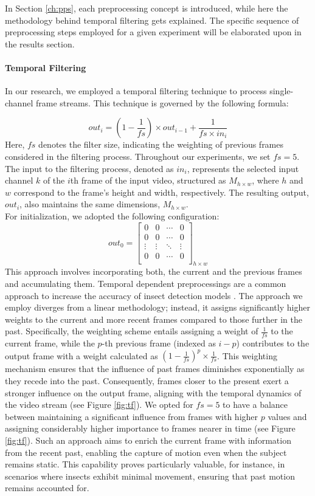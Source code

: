 \documentclass[sigchi,screen]{acmart}
\begin{document}
In Section \ref{ch:pps}, each preprocessing concept is introduced, while here the methodology behind temporal filtering gets explained. The specific sequence of preprocessing steps employed for a given experiment will be elaborated upon in the results section.

\paragraph{Temporal Filtering}
\label{ch:pp-tf}
In our research, we employed a temporal filtering technique to process single-channel frame streams. This technique is governed by the following formula:

\[
out_i = {\left(1 - \frac{1}{fs}\right)} \times out_{i-1} + \frac{1}{fs \times in_i} 
\] 
Here, $fs$ denotes the filter size, indicating the weighting of previous frames considered in the filtering process. Throughout our experiments, we set $fs = 5$. The input to the filtering process, denoted as $in_i$, represents the selected input channel $k$ of the $i$th frame of the input video, structured as $M_{h\times w}$, where $h$ and $w$ correspond to the frame's height and width, respectively. The resulting output, $out_i$, also maintains the same dimensions, $M_{h\times w}$. \\
For initialization, we adopted the following configuration: \[
out_0 = \begin{bmatrix}
0 & 0 & \cdots & 0 \\
0 & 0 & \cdots & 0 \\
\vdots & \vdots & \ddots & \vdots \\
0 & 0 & \cdots & 0 \\
\end{bmatrix}_{h \times w}
\] This approach involves incorporating both, the current and the previous frames and accumulating them. Temporal dependent preprocessings are a common approach to increase the accuracy of insect detection models \cite{thiele2021towards}. The approach we employ diverges from a linear methodology; instead, it assigns significantly higher weights to the current and more recent frames compared to those further in the past. Specifically, the weighting scheme entails assigning a weight of $\frac{1}{fs}$ to the current frame, while the $p$-th previous frame (indexed as $i-p$) contributes to the output frame with a weight calculated as ${\left(1-\frac{1}{fs}\right)}^p \times \frac{1}{fs}$. This weighting mechanism ensures that the influence of past frames diminishes exponentially as they recede into the past. Consequently, frames closer to the present exert a stronger influence on the output frame, aligning with the temporal dynamics of the video stream (see Figure \ref{fig:tf}). We opted for $fs = 5$ to have a balance between maintaining a significant influence from frames with higher $p$ values and assigning considerably higher importance to frames nearer in time (see Figure \ref{fig:tf}). Such an approach aims to enrich the current frame with information from the recent past, enabling the capture of motion even when the subject remains static. This capability proves particularly valuable, for instance, in scenarios where insects exhibit minimal movement, ensuring that past motion remains accounted for.
\end{document}
